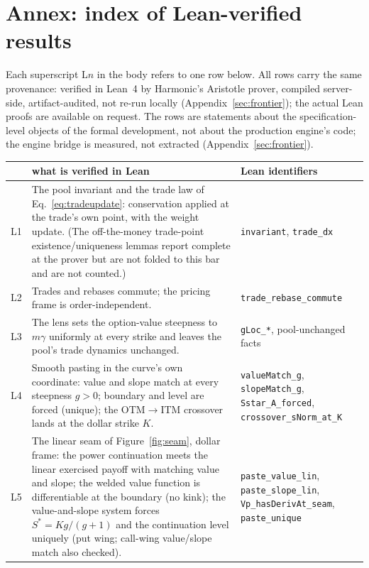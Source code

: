 \documentclass[runningheads]{llncs}
\begin{document}
\section{Annex: index of Lean-verified results}\label{app:lean}
Each superscript L$n$ in the body refers to one row below. All rows carry the
same provenance: verified in Lean~4 by Harmonic's Aristotle prover, compiled
server-side, artifact-audited, not re-run locally
(Appendix~\ref{sec:frontier}); the actual Lean proofs are available on
request. The rows are statements about the specification-level objects of the
formal development, not about the production engine's code; the engine bridge
is measured, not extracted (Appendix~\ref{sec:frontier}).
\begin{center}
\begin{tabularx}{\textwidth}{@{}l X l@{}}
\toprule
 & what is verified in Lean & Lean identifiers \\
\midrule
L1 & The pool invariant and the trade law of Eq.~\eqref{eq:tradeupdate}:
     conservation applied at the trade's own point, with the weight update.
     (The off-the-money trade-point existence/uniqueness lemmas report complete
     at the prover but are not folded to this bar and are not counted.)
     & \texttt{invariant}, \texttt{trade\_dx} \\
L2 & Trades and rebases commute; the pricing frame is order-independent.
     & \texttt{trade\_rebase\_commute} \\
L3 & The lens sets the option-value steepness to $m\gamma$ uniformly at every
     strike and leaves the pool's trade dynamics unchanged.
     & \texttt{gLoc\_*}, pool-unchanged facts \\
L4 & Smooth pasting in the curve's own coordinate: value and slope match at
     every steepness $g>0$; boundary and level are forced (unique); the
     OTM$\to$ITM crossover lands at the dollar strike $K$.
     & \texttt{valueMatch\_g}, \texttt{slopeMatch\_g},
       \texttt{Sstar\_A\_forced}, \texttt{crossover\_sNorm\_at\_K} \\
L5 & The linear seam of Figure~\ref{fig:seam}, dollar frame: the power
     continuation meets the linear exercised payoff with matching value and
     slope; the welded value function is differentiable at the boundary (no
     kink); the value-and-slope system forces $S^{\ast}=Kg/(g+1)$ and the
     continuation level uniquely (put wing; call-wing value/slope match also
     checked). & \texttt{paste\_value\_lin}, \texttt{paste\_slope\_lin},
       \texttt{Vp\_hasDerivAt\_seam}, \texttt{paste\_unique} \\

\end{tabularx}
\end{center}
\end{document}
